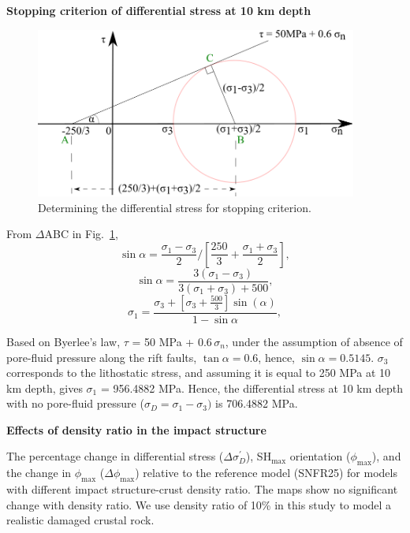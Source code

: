 \documentclass[draft,jgrga]{agutexSI2019}
\begin{document}
\begin{article}
\vspace{10mm} %

\noindent\textbf{Stopping criterion of differential stress at 10 km depth}
\vspace{10mm} %

\begin{figure}[ht]
\includegraphics[width=25pc]{Figures/Calc_diff_stress.png}
\caption{Determining the differential stress for stopping criterion.}
\label{S2}
\end{figure}

\vspace{5mm} %

From $\Delta$ABC in Fig.~\ref{S2},
\[
 \sin \alpha = \frac{\sigma_{1}-\sigma_{3}}{2} / \left[\frac{250}{3} + \frac{\sigma_{1}+\sigma_{3}}{2} \right],
\]
%
\[
 \sin \alpha = \frac{3(\sigma_{1}-\sigma_{3})}{3(\sigma_{1}+\sigma_{3})+500},
\]
%
\[
 \sigma_{1} = \frac{\sigma_{3}+[\sigma_{3}+\frac{500}{3}] \sin(\alpha)}{1-\sin \alpha},
\]

Based on Byerlee's law, $\tau$  = 50 MPa + 0.6$\,\sigma_n$, under the assumption of absence of pore-fluid pressure along the rift faults, $\tan \alpha = 0.6$, hence, $\sin \alpha = 0.5145$. $\sigma_{3}$ corresponds to the lithostatic stress, and assuming it is equal to 250 MPa at 10 km depth, gives $\sigma_{1}$ = 956.4882 MPa. Hence, the differential stress at 10 km depth with no pore-fluid pressure ($\sigma_{D} = \sigma_{1} - \sigma_{3})$ is 706.4882 MPa. 

\vspace{10mm} %

\noindent\textbf{Effects of density ratio in the impact structure}

The percentage change in differential stress ($\Delta\sigma_{D}^{\prime}$), SH$_{\max}$ orientation ($\phi_{\max}$), and the change in $\phi_{\max}$ ($\Delta\phi_{\max}$) relative to the reference model (SNFR25) for models with different impact structure-crust density ratio.  The maps show no significant change with density ratio. We use density ratio of 10\% in this study to model a realistic damaged crustal rock. 
\vspace{10mm} %


\end{article}
\end{document}
